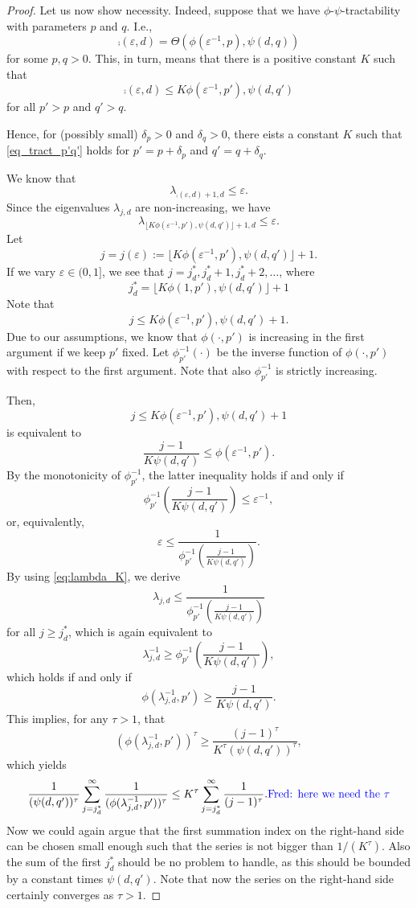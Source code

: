 \documentclass{article}
\theoremstyle{definition}
\newcommand{\fred}[1]{\begingroup\color{blue}Fred: #1\endgroup}
\begin{document}
{\begin{proof}
Let us now show necessity. Indeed, suppose that we have 
$\phi$-$\psi$-tractability with parameters $p$ and $q$. I.e., 
\[
\comp(\varepsilon,d)=\Theta (\phi(\varepsilon^{-1},p),\psi(d,q))
\]
for some $p,q>0$. This, in turn, means that there is a positive constant $K$ such that
\begin{equation}\label{eq_tract_p'q'}
\comp(\varepsilon,d)\le K \phi(\varepsilon^{-1},p'),\psi(d,q')
\end{equation}
for all $p'>p$ and $q'>q$. 

Hence, for (possibly small) $\delta_p>0$ and $\delta_q>0$, there eists a constant $K$ such that \eqref{eq_tract_p'q'} holds for $p'=p+\delta_p$ 
and $q'=q+\delta_q$.

We know that
\[
\lambda_{\comp(\varepsilon,d)+1,d}\le \varepsilon.
\]
Since the eigenvalues $\lambda_{j,d}$ are non-increasing, we have
\begin{equation}\label{eq:lambda_K}
\lambda_{\lfloor K \phi(\varepsilon^{-1},p'),\psi(d,q')\rfloor +1,d}\le \varepsilon.
\end{equation}
Let
\[
j=j (\varepsilon):= \lfloor K \phi(\varepsilon^{-1},p'),\psi(d,q')\rfloor +1.
\]
If we vary $\varepsilon\in (0,1]$, we see that $j=j_d^*, j_d^*+1, j_d^*+2,\ldots$, where 
\[
  j_d^*=\lfloor K \phi(1,p'),\psi(d,q')\rfloor +1
\]
Note that
\[
j\le K \phi(\varepsilon^{-1},p'),\psi(d,q') +1.
\]
Due to our assumptions, we know that 
$\phi(\cdot, p')$ is increasing in the first argument if 
we keep $p'$ fixed. Let $\phi_{p'}^{-1} (\cdot)$ be the inverse function of $\phi (\cdot, p')$ with respect to the first argument. Note that also $\phi_{p'}^{-1}$ is strictly increasing. 

Then, 
\[
j \le K \phi(\varepsilon^{-1},p'),\psi(d,q') +1
\]
is equivalent to
\[
\frac{j-1}{K \psi(d,q')} \le \phi(\varepsilon^{-1},p').
\]
By the monotonicity of $\phi_{p'}^{-1}$, the latter inequality holds if and only if
\[
  \phi_{p'}^{-1} \left(\frac{j-1}{K \psi(d,q')} \right)
  \le \varepsilon^{-1},
\]
or, equivalently,
\[
 \varepsilon \le \frac{1}{\phi_{p'}^{-1} \left(\frac{j-1}{K \psi(d,q')} \right)}.
\]
By using \eqref{eq:lambda_K}, we derive
\[
 \lambda_{j,d}\le \frac{1}{\phi_{p'}^{-1} \left(\frac{j-1}{K \psi(d,q')} \right)}
\]
for all $j\ge j_d^*$, which is again equivalent to 
\[
\lambda_{j,d}^{-1}\ge \phi_{p'}^{-1} \left(\frac{j-1}{K \psi(d,q')} \right),
\]
which holds if and only if
\[ 
 \phi (\lambda_{j,d}^{-1}, p') \ge \frac{j-1}{K \psi(d,q')}.
\]
This implies, for any $\tau>1$, that 
\[ 
 (\phi (\lambda_{j,d}^{-1}, p'))^\tau \ge \frac{(j-1)^\tau}{K^\tau (\psi(d,q'))^\tau},
\]
which yields
\[
\frac{1}{(\psi(d,q'))^\tau} \sum_{j=j_d^*}^\infty \frac{1}{(\phi (\lambda_{j,d}^{-1}, p'))^\tau} \le K^\tau \sum_{j=j_d^*}^\infty \frac{1}{(j-1)^\tau}.  \text{\fred{here we need the $\tau$}}
\]
Now we could again argue that the first summation index on the right-hand side can be chosen small enough such that the series is not bigger than $1/(K^\tau)$. Also the sum of the first $j_d^*$ should be no problem to handle, as this should be bounded by a constant times $\psi (d,q')$.
Note that now the series on the right-hand side certainly converges as $\tau>1$.
\end{proof}
}
\end{document}

